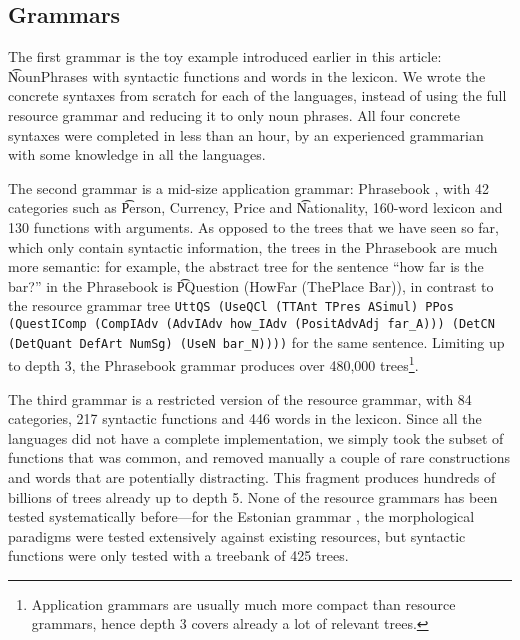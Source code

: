 \subsection{Grammars}

The first grammar is the toy example introduced earlier in this
article: \t{NounPhrases} with \numOfFun syntactic functions and
\numOfLex words in the lexicon. We wrote the concrete syntaxes from
scratch for each of the languages, instead of using the full resource
grammar and reducing it to only noun phrases. All four concrete
syntaxes were completed in less than an hour, by an experienced
grammarian with some knowledge in all the languages.

The second grammar is a mid-size application grammar: Phrasebook
\cite{ranta2010phrasebook}, with 42 categories such as \t{Person,
  Currency, Price} and \t{Nationality}, 160-word lexicon and 130
functions with arguments. As opposed to the trees that we have seen so far,
which only contain syntactic information, the trees in the Phrasebook
are much more semantic: for example, the abstract tree for the
sentence ``how far is the bar?'' in the Phrasebook is \t{PQuestion
  (HowFar (ThePlace Bar))}, in contrast to the resource grammar tree
{\tt \small UttQS (UseQCl (TTAnt TPres ASimul) PPos (QuestIComp
  (CompIAdv (AdvIAdv how\_IAdv (PositAdvAdj far\_A))) 
  (DetCN (DetQuant DefArt NumSg) (UseN bar\_N))))} for the same
sentence. Limiting up to depth 3, the Phrasebook grammar produces over
480,000 trees\footnote{Application grammars are usually
much more compact than resource grammars, hence depth 3 covers already
a lot of relevant trees.}.



The third grammar is a restricted version of the \gf{} resource grammar,
with 84 categories, 217 syntactic functions and 446 words in the
lexicon. Since all the languages did not have a complete
implementation, we simply took the subset of functions that was
common, and removed manually a couple of rare constructions and words
that are potentially distracting. 
This fragment produces hundreds of billions of trees already up to depth 5.
None of the resource grammars has been tested systematically before---for
the Estonian grammar \cite{listenmaa_kaljurand2014}, the morphological
paradigms were tested extensively against existing resources, but
syntactic functions were only tested with a treebank of 425 trees.

